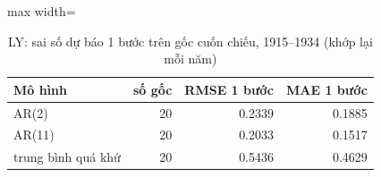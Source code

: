 \begin{table}[H]
\centering\small
\caption{LY: sai số dự báo 1 bước trên gốc cuốn chiếu, 1915--1934 (khớp lại mỗi năm)}\label{tab:tab_b11_13_ly_rolling}
\begin{adjustbox}{max width=\linewidth}
\begin{tabular}{lrrr}
\toprule
Mô hình & số gốc & RMSE 1 bước & MAE 1 bước \\
\midrule
AR(2) & 20 & 0.2339 & 0.1885 \\
AR(11) & 20 & 0.2033 & 0.1517 \\
trung bình quá khứ & 20 & 0.5436 & 0.4629 \\
\bottomrule
\end{tabular}
\end{adjustbox}
\end{table}
